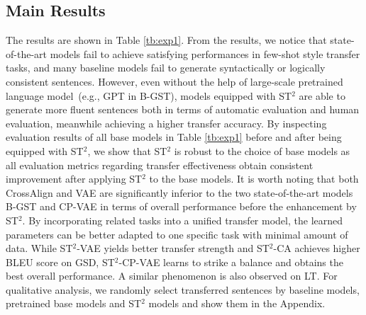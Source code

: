 \subsection{Main Results}
\label{sec:st}



The results are shown in Table \ref{tb:exp1}. From the results, we notice that state-of-the-art models fail to achieve satisfying performances in few-shot style transfer tasks, and many baseline models fail to generate syntactically or logically consistent sentences. However, even without the help of large-scale pretrained language model~(e.g., GPT in B-GST), models equipped with ST$^2$ are able to generate more fluent sentences both in terms of automatic evaluation and human evaluation, meanwhile achieving a higher transfer accuracy.  By inspecting evaluation results of all base models in Table \ref{tb:exp1} before and after being equipped with ST$^2$, we show that ST$^2$ is robust to the choice of base models as all evaluation metrics regarding transfer effectiveness obtain consistent improvement after applying ST$^2$ to the base models. It is worth noting that both CrossAlign and VAE are significantly inferior to the two state-of-the-art models B-GST and CP-VAE in terms of overall performance before the enhancement by ST$^2$. By incorporating related tasks into a unified transfer model, the learned parameters can be better adapted to one specific task with minimal amount of data.  While ST$^2$-VAE yields better transfer strength and ST$^2$-CA achieves higher BLEU score on GSD, ST$^2$-CP-VAE learns to strike a balance and obtains the best overall performance. A similar phenomenon is also observed on LT. For qualitative analysis, we randomly select transferred sentences
by baseline models, pretrained base models and ST$^2$ models and show them in the Appendix.



